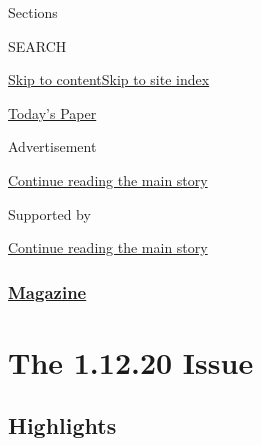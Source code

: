 Sections

SEARCH

\protect\hyperlink{site-content}{Skip to
content}\protect\hyperlink{site-index}{Skip to site index}

\href{https://myaccount.nytimes3xbfgragh.onion/auth/login?response_type=cookie\&client_id=vi}{}

\href{https://www.nytimes3xbfgragh.onion/section/todayspaper}{Today's
Paper}

Advertisement

\protect\hyperlink{after-top}{Continue reading the main story}

Supported by

\protect\hyperlink{after-sponsor}{Continue reading the main story}

\hypertarget{magazine}{%
\subsubsection{\texorpdfstring{\href{/section/magazine}{Magazine}}{Magazine}}\label{magazine}}

\hypertarget{the-11220-issue}{%
\section{The 1.12.20 Issue}\label{the-11220-issue}}

\hypertarget{highlights}{%
\subsection{Highlights}\label{highlights}}

